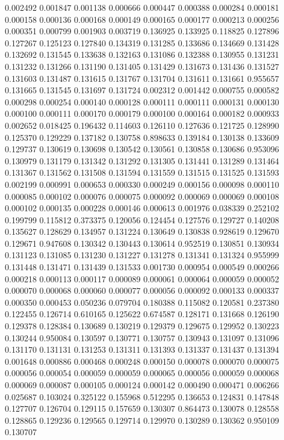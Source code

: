 0.002492
0.001847
0.001138
0.000666
0.000447
0.000388
0.000284
0.000181
0.000158
0.000136
0.000168
0.000149
0.000165
0.000177
0.000213
0.000256
0.000351
0.000799
0.001903
0.003719
0.136925
0.133925
0.118825
0.127896
0.127267
0.125123
0.127840
0.134319
0.131285
0.133686
0.134669
0.131428
0.132692
0.131545
0.133638
0.132163
0.131086
0.132388
0.130955
0.131231
0.131232
0.131266
0.131190
0.131405
0.131429
0.131673
0.131436
0.131527
0.131603
0.131487
0.131615
0.131767
0.131704
0.131611
0.131661
0.955657
0.131665
0.131545
0.131697
0.131724
0.002312
0.001442
0.000755
0.000582
0.000298
0.000254
0.000140
0.000128
0.000111
0.000111
0.000131
0.000130
0.000100
0.000111
0.000170
0.000179
0.000100
0.000164
0.000182
0.000933
0.002652
0.018425
0.196432
0.114603
0.126110
0.127636
0.121725
0.128990
0.125370
0.129229
0.137182
0.130758
0.898633
0.139184
0.130138
0.133609
0.129737
0.130619
0.130698
0.130542
0.130561
0.130858
0.130686
0.953096
0.130979
0.131179
0.131342
0.131292
0.131305
0.131441
0.131289
0.131464
0.131367
0.131562
0.131508
0.131594
0.131559
0.131515
0.131525
0.131593
0.002199
0.000991
0.000653
0.000330
0.000249
0.000156
0.000098
0.000110
0.000085
0.000102
0.000076
0.000075
0.000092
0.000069
0.000069
0.000108
0.000102
0.000135
0.000228
0.000146
0.000613
0.001976
0.038339
0.252102
0.199799
0.115812
0.373375
0.120056
0.124454
0.127576
0.129727
0.140208
0.135627
0.128629
0.134957
0.131224
0.130649
0.130838
0.928619
0.129670
0.129671
0.947608
0.130342
0.130443
0.130614
0.952519
0.130851
0.130934
0.131123
0.131085
0.131230
0.131227
0.131278
0.131341
0.131324
0.955999
0.131448
0.131471
0.131439
0.131533
0.001730
0.000954
0.000549
0.000266
0.000218
0.000113
0.000117
0.000089
0.000061
0.000064
0.000059
0.000052
0.000070
0.000068
0.000060
0.000077
0.000056
0.000092
0.000133
0.000337
0.000350
0.000453
0.050236
0.079704
0.180388
0.115082
0.120581
0.237380
0.122455
0.126714
0.610165
0.125622
0.674587
0.128171
0.131668
0.126190
0.129378
0.128384
0.130689
0.130219
0.129379
0.129675
0.129952
0.130223
0.130244
0.950084
0.130597
0.130771
0.130757
0.130943
0.131097
0.131096
0.131170
0.131131
0.131253
0.131311
0.131393
0.131337
0.131437
0.131394
0.001648
0.000886
0.000468
0.000248
0.000150
0.000078
0.000070
0.000075
0.000056
0.000054
0.000059
0.000059
0.000065
0.000056
0.000059
0.000068
0.000069
0.000087
0.000105
0.000124
0.000142
0.000490
0.000471
0.006266
0.025687
0.103024
0.325122
0.155968
0.512295
0.136653
0.124831
0.147848
0.127707
0.126704
0.129115
0.157659
0.130307
0.864473
0.130078
0.128558
0.128865
0.129236
0.129565
0.129714
0.129970
0.130289
0.130362
0.950109
0.130707
